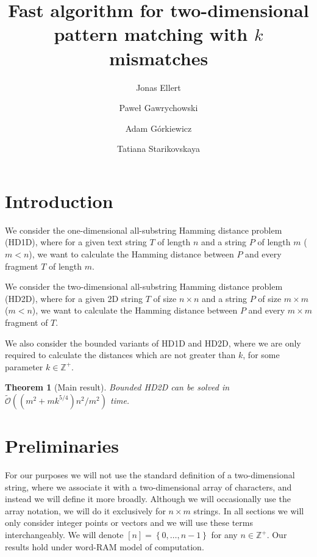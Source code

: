 \documentclass[11pt]{article}
\title{Fast algorithm for two-dimensional pattern matching with $k$ mismatches}
\author[1]{Jonas Ellert}
\author[2]{Paweł Gawrychowski}
\author[3]{Adam Górkiewicz}
\author[4]{Tatiana Starikovskaya}
\affil[1]{?}
\affil[2]{?}
\affil[3]{?}
\affil[4]{?}
\newcommand{\Z}{\mathbb{Z}}
\newcommand{\tO}{\tilde{\mathcal{O}}}
\newcommand{\set}[1]{\left\lbrace #1 \right\rbrace}
\theoremstyle{plain}
\newtheorem{theorem}{Theorem}
\theoremstyle{definition}
\theoremstyle{remark}
\begin{document}
\date{}
\maketitle

\begin{abstract}
\end{abstract}



\section{Introduction}

\newcommand{\hd}{\textsc{HD1D}\xspace}
\newcommand{\HD}{\textsc{HD2D}\xspace}

We consider the one-dimensional all-substring Hamming distance problem (\hd), where for a given text string $T$ of length $n$ and a string $P$ of length $m$ ($m < n$), we want to calculate the Hamming distance between $P$ and every fragment $T$ of length $m$.

We consider the two-dimensional all-substring Hamming distance problem (\HD), where for a given 2D string $T$ of size $n \times n$ and a string $P$ of size $m \times m$ ($m < n$), we want to calculate the Hamming distance between $P$ and every $m \times m$ fragment of $T$.

We also consider the bounded variants of \hd and \HD, where we are only required to calculate the distances which are not greater than $k$, for some parameter $k \in \Z^+$.


\begin{theorem}[Main result]\label{main result}
	Bounded \HD can be solved in $\tO((m^2 + mk^{5/4})n^2 / m^2)$ time.
\end{theorem}


\section{Preliminaries}

For our purposes we will not use the standard definition of a two-dimensional string, where we associate it with a two-dimensional array of characters, and instead we will define it more broadly.
Although we will occasionally use the array notation, we will do it exclusively for $n \times m$ strings.
In all sections we will only consider integer points or vectors and we will use these terms interchangeably.
We will denote $[n] = \set{0, \dots, n - 1}$ for any $n \in \Z^+$.
Our results hold under word-RAM model of computation.
\end{document}
